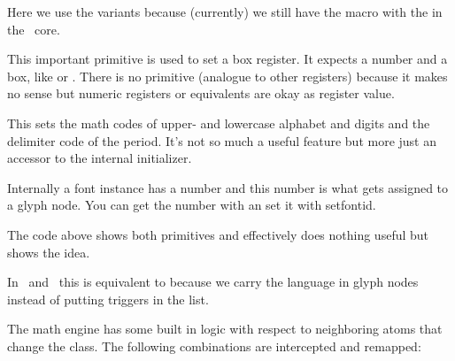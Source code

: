 Here we use the  variants because (currently) we still have the
macro with the \type {\expanded} in the \CONTEXT\ core.

\startlines \tttf \getbuffer \stoplines

\stopnewprimitive

\startoldprimitive[title={\prm {setbox}}]

This important primitive is used to set a box register. It expects a number and a
box, like  or . There is no \type {\boxdef} primitive
(analogue to other registers) because it makes no sense but numeric registers or
equivalents are okay as register value.

\stopoldprimitive

\startnewprimitive[title={\prm {setdefaultmathcodes}}]

This sets the math codes of upper- and lowercase alphabet and digits and the
delimiter code of the period. It's not so much a useful feature but more just an
accessor to the internal initializer.

\stopnewprimitive

\startnewprimitive[title={\prm {setfontid}}]

Internally a font instance has a number and this number is what gets assigned to
a glyph node. You can get the number with  an set it with \prm
{setfontid}.

\starttyping
\setfontid\fontid\font
\stoptyping

The code above shows both primitives and effectively does nothing useful but
shows the idea.

\stopnewprimitive

\startoldprimitive[title={\prm {setlanguage}}]

In \LUATEX\ and \LUAMETATEX\ this is equivalent to  because we
carry the language in glyph nodes instead of putting triggers in the list.

\stopoldprimitive

\startnewprimitive[title={\prm {setmathatomrule}}]

The math engine has some built in logic with respect to neighboring atoms that
change the class. The following combinations are intercepted and remapped:

